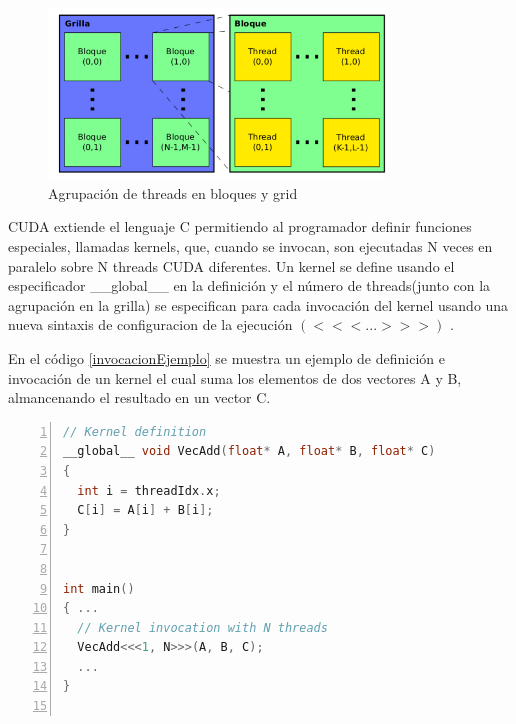 \documentclass[a4paper,10pt]{report}
\begin{document}
\begin{figure}
  \centering
    \includegraphics[width=0.8\textwidth]{img/grilla.png}
  \caption{Agrupación de threads en bloques y grid}
  \label{grilla}
\end{figure}
% 

CUDA extiende el lenguaje C permitiendo al programador definir funciones especiales, llamadas kernels, que, cuando se invocan, son ejecutadas N veces en paralelo sobre N threads CUDA diferentes. 
Un kernel se define usando el especificador \_\_global\_\_ en la definición y el número de threads(junto con la agrupación en la grilla) se especifican para cada invocación del kernel usando
una nueva sintaxis de configuracion de la ejecución $(<<<...>>>)$ . 


En el código \ref{invocacionEjemplo} se muestra un ejemplo de definición e invocación de un kernel el cual suma los elementos de dos vectores A y B, almancenando el resultado en un vector C.
\begin{lstlisting}[frame=bt,title={aa},caption={imgproc/src/opencl/cvtcolor.cl},label={invocacionEjemplo},
columns=fullflexible,numbers=left,backgroundcolor=\color{LemonChiffon1},basicstyle=\footnotesize,keywordstyle=\ttfamily\footnotesize,language=C++,stringstyle=\ttfamily,breaklines=true,xleftmargin=0.5em,xrightmargin=0pt,aboveskip=\bigskipamount,belowskip=\bigskipamount]
// Kernel definition 
__global__ void VecAdd(float* A, float* B, float* C) 
{ 
  int i = threadIdx.x; 
  C[i] = A[i] + B[i]; 
} 


int main() 
{ ... 
  // Kernel invocation with N threads 
  VecAdd<<<1, N>>>(A, B, C); 
  ... 
}


\end{lstlisting}
\end{document}
